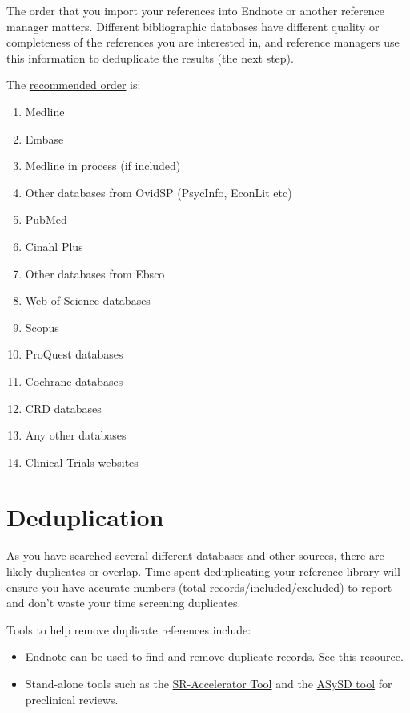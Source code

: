 \documentclass[
]{book}
\providecommand{\tightlist}{%
  \setlength{\itemsep}{0pt}\setlength{\parskip}{0pt}}
\begin{document}
The order that you import your references into Endnote or another reference manager matters. Different bibliographic databases have different quality or completeness of the references you are interested in, and reference managers use this information to deduplicate the results (the next step).

The \href{https://blogs.lshtm.ac.uk/library/2018/12/07/removing-duplicates-from-an-endnote-library/}{recommended order} is:

\begin{enumerate}
\def\labelenumi{\arabic{enumi}.}
\tightlist
\item
  Medline
\item
  Embase
\item
  Medline in process (if included)
\item
  Other databases from OvidSP (PsycInfo, EconLit etc)
\item
  PubMed
\item
  Cinahl Plus
\item
  Other databases from Ebsco
\item
  Web of Science databases
\item
  Scopus
\item
  ProQuest databases
\item
  Cochrane databases
\item
  CRD databases
\item
  Any other databases
\item
  Clinical Trials websites
\end{enumerate}

\hypertarget{deduplication}{%
\section{Deduplication}\label{deduplication}}

As you have searched several different databases and other sources, there are likely duplicates or overlap. Time spent deduplicating your reference library will ensure you have accurate numbers (total records/included/excluded) to report and don't waste your time screening duplicates.

Tools to help remove duplicate references include:

\begin{itemize}
\tightlist
\item
  Endnote can be used to find and remove duplicate records. See \href{10.3163/1536-5050.104.3.014}{this resource.}
\item
  Stand-alone tools such as the \href{https://doi.org/10.1186/2046-4053-4-6}{SR-Accelerator Tool} and the \href{https://camarades.shinyapps.io/RDedup/}{ASySD tool} for preclinical reviews.
\end{itemize}
\end{document}
